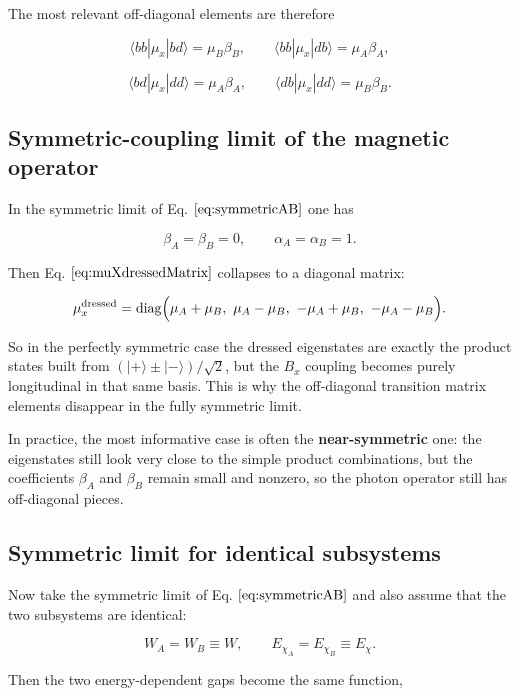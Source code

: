 \documentclass[
]{article}
\renewcommand{\[}{\begin{equation}}
\renewcommand{\]}{\end{equation}}
\begin{document}
The most relevant off-diagonal elements are therefore

\[
\langle bb|\mu_x|bd\rangle=\mu_B\beta_B,
\qquad
\langle bb|\mu_x|db\rangle=\mu_A\beta_A,
\label{eq:bbcouplings}
\]

\[
\langle bd|\mu_x|dd\rangle=\mu_A\beta_A,
\qquad
\langle db|\mu_x|dd\rangle=\mu_B\beta_B.
\label{eq:ddcouplings}
\]

\subsection{Symmetric-coupling limit of the magnetic
operator}\label{symmetric-coupling-limit-of-the-magnetic-operator}

In the symmetric limit of Eq. \(\ref{eq:symmetricAB}\) one has

\[
\beta_A=\beta_B=0,
\qquad
\alpha_A=\alpha_B=1.
\label{eq:symmetricAlphaBeta}
\]

Then Eq. \(\ref{eq:muXdressedMatrix}\) collapses to a diagonal matrix:

\[
\mu_x^{\rm dressed} =
\mathrm{diag}
\Big(
\mu_A+\mu_B,\ \mu_A-\mu_B,\ -\mu_A+\mu_B,\ -\mu_A-\mu_B
\Big).
\label{eq:muXdressedSym}
\]

So in the perfectly symmetric case the dressed eigenstates are exactly
the product states built from \((|+\rangle\pm|-\rangle)/\sqrt2\), but
the \(B_x\) coupling becomes purely longitudinal in that same basis.
This is why the off-diagonal transition matrix elements disappear in the
fully symmetric limit.

In practice, the most informative case is often the
\textbf{near-symmetric} one: the eigenstates still look very close to
the simple product combinations, but the coefficients \(\beta_A\) and
\(\beta_B\) remain small and nonzero, so the photon operator still has
off-diagonal pieces.

\subsection{Symmetric limit for identical
subsystems}\label{symmetric-limit-for-identical-subsystems}

Now take the symmetric limit of Eq. \(\ref{eq:symmetricAB}\) and also
assume that the two subsystems are identical:

\[
W_A = W_B \equiv W,
\qquad
E_{\chi_A}=E_{\chi_B}\equiv E_\chi.
\label{eq:identicalAB}
\]

Then the two energy-dependent gaps become the same function,
\end{document}
